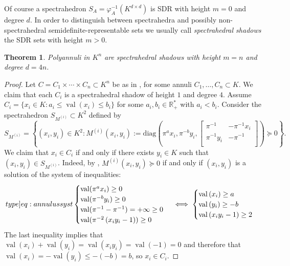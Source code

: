 \documentclass[a4paper,12pt]{article}
\newtheorem{theorem}{Theorem}[section]
\newcommand{\R}{\mathbb{R}} %
\DeclareMathOperator{\val}{val}
\def\diag{\mathrm{diag}}
\begin{document}
Of course a spectrahedron $S_A = \varphi_A^{-1}(K^{d \times d})$ is SDR with height $m=0$ and degree
$d$. In order to distinguish between spectrahedra and possibly non-spectrahedral semidefinite-representable sets
we usually call \emph{spectrahedral shadows} the SDR sets with height $m>0$.

\begin{theorem}
Polyannuli in $K^n$ are spectrahedral shadows with height $m=n$ and degree $d=4n$.
\end{theorem}
\begin{proof}
  Let $C = C_1 \times \cdots \times C_n \subset K^n$ be as in ,
  for some annuli $C_1,\ldots,C_n \subset K$. We claim that each $C_i$ is a spectrahedral
  shadow of height $1$ and degree $4$. Assume $C_i = \{x_i \in K : a_i \leq \val(x_i) \leq b_i\}$
  for some $a_i, b_i \in \R^*_+$ with $a_i < b_i$. Consider the spectrahedron
  $S_{M^{(i)}} \subset K^2$ defined by
  $$
  S_{M^{(i)}} = \left\{(x_i,y_i) \in K^2 :
  M^{(i)}(x_i,y_i) := \diag\left(\pi^a x_i, \pi^{-b} y_i,
  \begin{bmatrix}
    \pi^{-1} & -\pi^{-1} x_i  \\
    \pi^{-1} y_i & - \pi^{-1} \\
  \end{bmatrix}\right) \succeq 0
  \right\}.
  $$
  We claim that $x_i \in C_i$ if and only if there exists $y_i \in K$ such that $(x_i,y_i) \in S_{M^{(i)}}$.
  Indeed, by , $M^{(i)}(x_i,y_i) \succeq 0$ if and only if $(x_i,y_i)$ is a solution of the system
  of inequalities:
  \begin{equation}
    \label[type]{eq:annulussyst}
    \begin{cases}
      \val(\pi^a x_i) \ge 0 \\
  \val(\pi^{-b} y_i) \ge 0\\
  \val(\pi^{-1}- \pi^{-1}) = +\infty \ge 0\\
  \val(\pi^{-2}\left( x_iy_i-1 \right))  \ge 0 
\end{cases}
\iff	
\begin{cases} 
  \val\left(x_i\right)\ge a\\
  \val\left(y_i\right)\ge -b\\
  \val\left(x_iy_i-1 \right) \ge 2
\end{cases}
\end{equation}
  The last inequality implies that $\val\left(x_i\right)+\val\left(y_i\right)=\val\left(x_iy_i\right) = \val\left(-1\right) =0$ and therefore that $\val\left(x_i\right)=-\val\left(y_i\right)\le -(-b) = b$, so $x_i \in C_i$. 

\end{proof}
\end{document}
